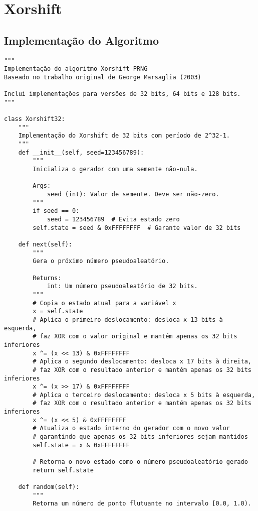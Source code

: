 \section{Xorshift}\label{apx:xorshift-impl}

\subsection{Implementação do Algoritmo}

\begin{verbatim}
"""
Implementação do algoritmo Xorshift PRNG
Baseado no trabalho original de George Marsaglia (2003)

Inclui implementações para versões de 32 bits, 64 bits e 128 bits.
"""

class Xorshift32:
    """
    Implementação do Xorshift de 32 bits com período de 2^32-1.
    """
    def __init__(self, seed=123456789):
        """
        Inicializa o gerador com uma semente não-nula.
        
        Args:
            seed (int): Valor de semente. Deve ser não-zero.
        """
        if seed == 0:
            seed = 123456789  # Evita estado zero
        self.state = seed & 0xFFFFFFFF  # Garante valor de 32 bits
    
    def next(self):
        """
        Gera o próximo número pseudoaleatório.
        
        Returns:
            int: Um número pseudoaleatório de 32 bits.
        """
        # Copia o estado atual para a variável x
        x = self.state
        # Aplica o primeiro deslocamento: desloca x 13 bits à esquerda, 
        # faz XOR com o valor original e mantém apenas os 32 bits inferiores
        x ^= (x << 13) & 0xFFFFFFFF
        # Aplica o segundo deslocamento: desloca x 17 bits à direita,
        # faz XOR com o resultado anterior e mantém apenas os 32 bits inferiores
        x ^= (x >> 17) & 0xFFFFFFFF
        # Aplica o terceiro deslocamento: desloca x 5 bits à esquerda,
        # faz XOR com o resultado anterior e mantém apenas os 32 bits inferiores
        x ^= (x << 5) & 0xFFFFFFFF
        # Atualiza o estado interno do gerador com o novo valor
        # garantindo que apenas os 32 bits inferiores sejam mantidos
        self.state = x & 0xFFFFFFFF
        
        # Retorna o novo estado como o número pseudoaleatório gerado
        return self.state
    
    def random(self):
        """
        Retorna um número de ponto flutuante no intervalo [0.0, 1.0).
        

\end{verbatim}
